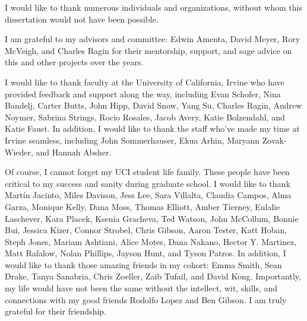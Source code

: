 \acknowledgments
{
  I would like to thank numerous individuals and organizations, without whom this dissertation would not have been possible. 
  
  I am grateful to my advisors and committee: Edwin Amenta, David Meyer, Rory McVeigh, and Charles Ragin for their mentorship, support, and sage advice on this and other projects over the years. 
  
  
  I would like to thank faculty at the University of California, Irvine who have provided feedback and support along the way, including Evan Schofer, Nina Bandelj, Carter Butts, John Hipp, David Snow, Yang Su, Charles Ragin, Andrew Noymer, Sabrina Strings, Rocio Rosales, Jacob Avery, Katie Bolzendahl, and Katie Faust. In addition, I would like to thank the staff who've made my time at Irvine seamless, including John Sommerhauser, Ekua Arhin, Maryann Zovak-Wieder, and Hannah Absher.
  
  Of course, I cannot forget my UCI student life family. These people have been critical to my success and sanity during graduate school. I would like to thank Mart\'{i}n Jacinto, Miles Davison, Jess Lee, Sara Villalta, Claudia Campos, Alma Garza, Monique Kelly, Dana Moss, Thomas Elliott, Amber Tierney, Eulalie Laschever, Kara Placek, Ksenia Gracheva, Ted Watson, John McCollum, Bonnie Bui, Jessica Kizer, Connor Strobel, Chris Gibson, Aaron Tester, Katt Hoban, Steph Jones, Mariam Ashtiani, Alice Motes, Dana Nakano, Hector Y. Martinez, Matt Rafalow, Nolan Phillips, Jayson Hunt, and Tyson Patros. In addition, I would like to thank those amazing friends in my cohort: Emma Smith, Sean Drake, Tanya Sanabria, Chris Zoeller, Zaib Tufail, and David Kong. Importantly, my life would have not been the same without the intellect, wit, skills, and connections with my good friends Rodolfo Lopez and Ben Gibson. I am truly grateful for their friendship. 
  
}
